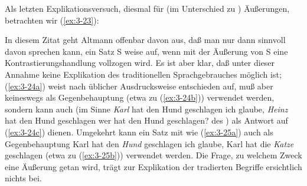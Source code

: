 \documentclass[output=paper]{langsci/langscibook}
\begin{document}
Als letzten Explikationsversuch, diesmal für  (im
Unterschied zu ) Äußerungen, betrachten wir
(\ref{ex:3-23}):
\begin{exe}
	\settowidth{}
\end{exe}
In diesem Zitat geht Altmann offenbar davon aus, daß man nur dann
sinnvoll davon sprechen kann, ein Satz S weise
 auf, wenn mit der Äußerung von S eine
Kontrastierungshandlung vollzogen wird. Es ist aber klar, daß unter
dieser Annahme keine Explikation des traditionellen Sprachgebrauches
möglich ist; (\ref{ex:3-24a}) \zb weist nach üblicher Ausdrucksweise entschieden
 auf, muß aber keineswegs als Gegenbehauptung
(etwa zu (\ref{ex:3-24b})) verwendet werden, sondern kann auch (im Sinne
\eal \label{ex:3-24}
\ex
\label{ex:3-24a}
\textit{Karl} hat den Hund geschlagen
\ex
\label{ex:3-24b}
ich glaube, \textit{Heinz} hat den Hund geschlagen
\ex
\label{ex:3-24c}
wer hat den Hund geschlagen?
\zl
des ) als Antwort auf (\ref{ex:3-24c}) dienen. Umgekehrt
kann ein Satz mit  wie (\ref{ex:3-25a}) auch als
Gegenbehauptung
\eal \label{ex:3-25}
\ex
\label{ex:3-25a}
Karl hat den \textit{Hund} geschlagen
\ex
\label{ex:3-25b}
ich glaube, Karl hat die \textit{Katze} geschlagen
\zl
(etwa zu (\ref{ex:3-25b})) verwendet werden. Die Frage, zu welchem Zweck eine
Äußerung getan wird, trägt zur Explikation der tradierten Begriffe
ersichtlich nichts bei.
\end{document}
